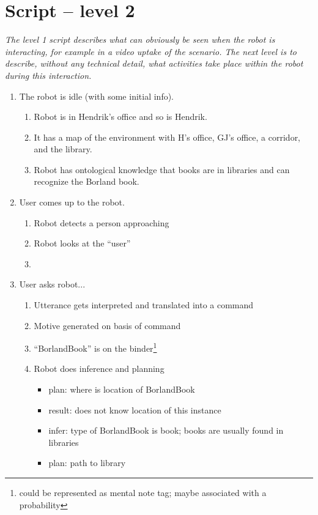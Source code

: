 \documentclass{article}
\begin{document}
\section{Script -- level 2}
\textit{
  The level 1 script describes what can obviously be seen when the
  robot is interacting, for example in a video uptake of the
  scenario. The next level is to describe, without any technical
  detail, what activities take place within the robot during this
  interaction. }



\begin{enumerate}
\item \label{lvl2:1}
	The robot is idle (with some initial info).
	\begin{enumerate}
	\item Robot is in Hendrik's office and so is Hendrik.
	\item It has a map of the environment with H's office, 
			GJ's office, a corridor, and the library.
	\item Robot has ontological knowledge that books are 
			in libraries and can recognize the Borland book.
	\end{enumerate}
\item \label{lvl2:2} 
	User comes up to the robot.
	\begin{enumerate}
	\item Robot detects a person approaching
	\item Robot looks at the ``user''
	\item 	
	\end{enumerate}

\item \label{lvl2:3} 
	User asks robot...
	\begin{enumerate}
	\item Utterance gets interpreted and translated into a command
	\item Motive generated on basis of command
	\item ``BorlandBook'' is on the binder\footnote{could be represented
		as mental note tag; maybe associated with a probability}
	\item Robot does inference and planning
		\begin{itemize}
		\item plan: where is location of BorlandBook
		\item result: does not know location of this instance
		\item infer: type of BorlandBook is book; books are usually found in libraries
		\item plan: path to library
		

\end{itemize}
\end{enumerate}
\end{enumerate}
\end{document}
